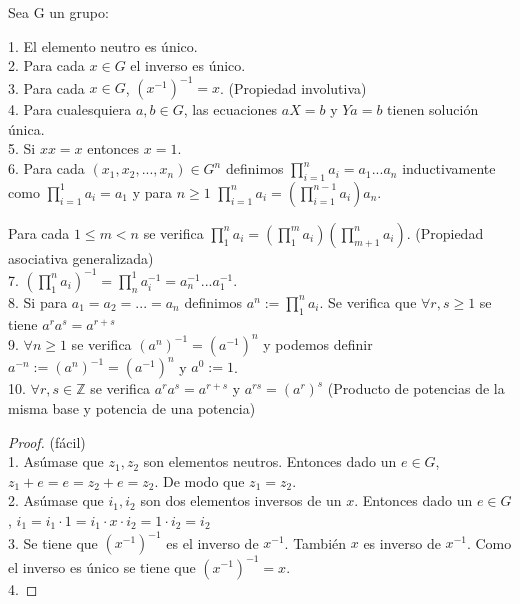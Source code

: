 \begin{proposition}
Sea G un grupo:

1. El elemento neutro es único. \\
2. Para cada $x \in G$ el inverso es único. \\
3. Para cada $x \in G$, $(x^{-1})^{-1} = x$. (Propiedad involutiva) \\
4. Para cualesquiera $a,b \in G$, las ecuaciones $aX = b$ y $Ya = b$ tienen solución única. \\
5. Si $xx = x$ entonces $x=1$. \\
6. Para cada $(x_1,x_2,...,x_n) \in G^{n}$ definimos $\prod_{i=1}^{n} a_i = a_1...a_n$ inductivamente como $\prod_{i=1}^{1} a_i = a_1$ y para $n \geq 1$ $\prod_{i=1}^{n} a_i = (\prod_{i=1}^{n-1} a_i)a_n$.

Para cada $1 \leq m < n$ se verifica $\prod_{1}^{n} a_i = (\prod_{1}^{m} a_i)(\prod_{m+1}^{n} a_i)$. (Propiedad asociativa generalizada)\\
7. $(\prod_{1}^n a_i)^{-1} = \prod_{n}^{1} a_i^{-1} = a_n^{-1}...a_1^{-1}$. \\
8. Si para $a_1 = a_2 = ... = a_n$ definimos $a^n := \prod_{1}^{n} a_i$. Se verifica que $\forall r,s \ge 1$ se tiene $a^ra^s= a^{r+s}$  \\
9. $\forall n \ge 1$ se verifica $(a^n)^{-1} = (a^{-1})^n$ y podemos definir $a^{-n} := (a^n)^{-1} = (a^{-1})^n$ y $a^0 := 1$. \\
10. $\forall r,s \in \mathbb{Z}$ se verifica $a^ra^s = a^{r+s}$ y $a^{rs} = (a^r)^s$ (Producto de potencias de la misma base y potencia de una potencia)
\end{proposition}
\begin{proof}
(fácil) \\
1. Asúmase que $z_1,z_2$ son elementos neutros. Entonces dado un $e \in G$, $z_1 + e = e = z_2 + e = z_2$. De modo que $z_1 = z_2$. \\
2. Asúmase que $i_1,i_2$ son dos elementos inversos de un $x$. Entonces dado un $e \in G$, $i_1 = i_1 \cdot 1 = i_1 \cdot x \cdot i_2 = 1 \cdot i_2 = i_2$ \\
3. Se tiene que $(x^{-1})^{-1}$ es el inverso de $x^{-1}$. También $x$ es inverso de $x^{-1}$. Como el inverso es único se tiene que $(x^{-1})^{-1} = x$. \\
4.
\end{proof}

